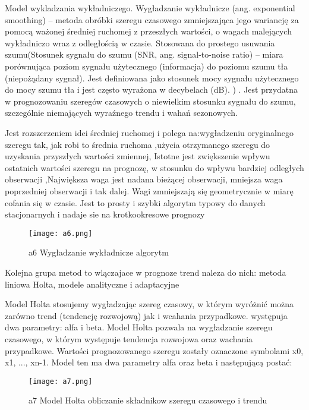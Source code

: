 Model wykladzania wykładniczego.
Wygładzanie wykładnicze (ang. exponential smoothing) – metoda obróbki szeregu czasowego zmniejszająca jego wariancję za pomocą ważonej średniej ruchomej z przeszłych wartości, o wagach malejących wykładniczo wraz z odległością w czasie. Stosowana do prostego usuwania szumu(Stosunek sygnału do szumu (SNR, ang. signal-to-noise ratio) – miara porównująca poziom sygnału użytecznego (informacja) do poziomu szumu tła (niepożądany sygnał). Jest definiowana jako stosunek mocy sygnału użytecznego do mocy szumu tła i jest często wyrażona w decybelach (dB). ) . Jest przydatna w prognozowaniu szeregów czasowych o niewielkim stosunku sygnału do szumu, szczególnie niemających wyraźnego trendu i wahań sezonowych. \cite{wyg2023}

Jest rozszerzeniem idei średniej ruchomej i polega na:wygładzeniu oryginalnego szeregu tak, jak robi to średnia ruchoma ,użycia otrzymanego szeregu do uzyskania przyszłych wartości 
zmiennej, Istotne jest zwiększenie wpływu ostatnich wartości szeregu na 
prognozę, w stosunku do wpływu bardziej odległych obserwacji ,Największa waga jest nadana bieżącej obserwacji, mniejsza waga poprzedniej obserwacji i tak dalej. Wagi zmniejszają się 
geometrycznie w miarę cofania się w czasie. Jest to prosty i szybki algorytm typowy do danych stacjonarnych i nadaje sie na krotkookresowe prognozy\cite{szer2009}


\begin{figure}[h!]
    \label{fig:a6}
    \centering \texttt{[image: a6.png]}
    \caption{a6 Wygładzanie wykładnicze algorytm\cite{szer2009}}
\end{figure}


Kolejna grupa metod to wlączajace w prognoze trend naleza do nich:  metoda liniowa Holta, modele analityczne i adaptacyjne


\vspace{\baselineskip}
Model Holta stosujemy wygładzając szereg czasowy, w którym wyróżnić można zarówno trend (tendencję rozwojową) jak i wcahania przypadkowe.  występuja dwa parametry: alfa i beta.\cite{hol2023}
 \vspace{\baselineskip}
Model Holta pozwala na wygładzanie szeregu czasowego, w którym występuje tendencja rozwojowa oraz wachania przypadkowe. Wartości prognozowanego szeregu zostały oznaczone symbolami x0, x1, ..., xn-1. Model ten ma dwa parametry alfa oraz beta i następującą postać:
\begin{figure}[h!]
    \label{fig:a7}
    \centering \texttt{[image: a7.png]}
    \caption{a7 Model Holta  obliczanie składnikow szeregu czasowego i trendu\cite{szos2012}}
\end{figure}


